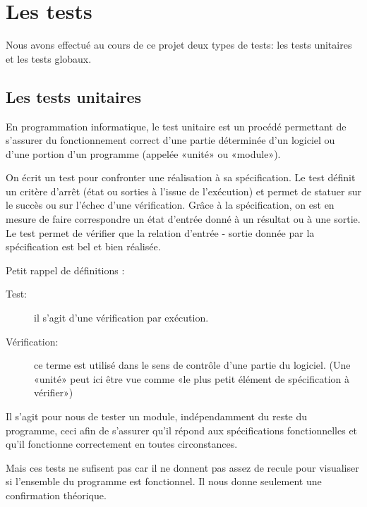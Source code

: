
\section{Les tests}
Nous avons effectué au cours de ce projet deux types de tests: les tests unitaires et les tests globaux.

    \subsection{Les tests unitaires}
En programmation informatique, le test unitaire est un procédé permettant de s'assurer du fonctionnement correct d'une partie déterminée d'un logiciel ou d'une portion d'un programme (appelée «unité» ou «module»).

On écrit un test pour confronter une réalisation à sa spécification. Le test définit un critère d’arrêt (état ou sorties à l’issue de l’exécution) et permet de statuer sur le succès ou sur l’échec d’une vérification. Grâce à la spécification, on est en mesure de faire correspondre un état d’entrée donné à un résultat ou à une sortie. Le test permet de vérifier que la relation d’entrée - sortie donnée par la spécification est bel et bien réalisée.

Petit rappel de définitions :
\begin{description}
\item[Test:] il s'agit d'une vérification par exécution.
\item[Vérification:] ce terme est utilisé dans le sens de contrôle d'une partie du logiciel. (Une «unité» peut ici être vue comme «le plus petit élément de spécification à vérifier»)
\end{description}

Il s'agit pour nous de tester un module, indépendamment du reste du programme, ceci afin de s'assurer qu'il répond aux spécifications fonctionnelles et qu'il fonctionne correctement en toutes circonstances.

Mais ces tests ne sufisent pas car il ne donnent pas assez de recule pour visualiser si l'ensemble du programme est fonctionnel. Il nous donne seulement une confirmation théorique.

